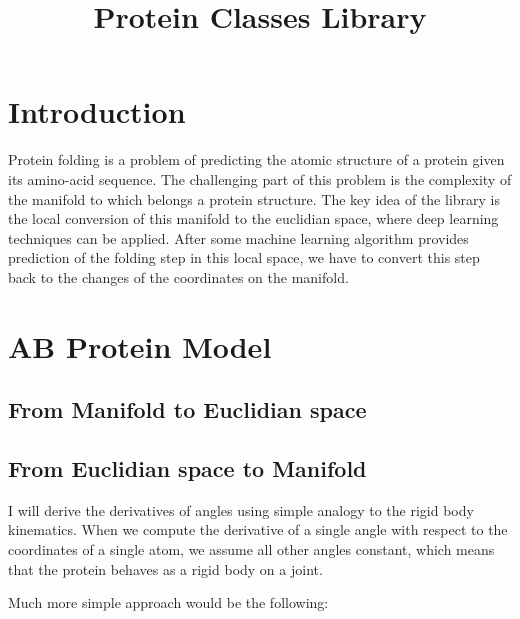 \documentclass[a4paper,10pt]{article}
\title{Protein Classes Library}
\author{}
\begin{document}
\maketitle

\section{Introduction}
Protein folding is a problem of predicting the atomic structure of a protein given its amino-acid sequence. 
The challenging part of this problem is the complexity of the manifold to which belongs a protein structure.
The key idea of the library is the local conversion of this manifold to the euclidian space, where deep learning
techniques can be applied. After some machine learning algorithm provides prediction of the folding step in this 
local space, we have to convert this step back to the changes of the coordinates on the manifold.

\section{AB Protein Model}

\subsection{From Manifold to Euclidian space}


\subsection{From Euclidian space to Manifold}
I will derive the derivatives of angles using simple analogy to the rigid body kinematics.
When we compute the derivative of a single angle with respect to the coordinates of a single atom, 
we assume all other angles constant, which means that the protein behaves as a rigid body on a joint.

% 

Much more simple approach would be the following:
% 



\end{document}
